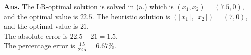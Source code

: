 \documentclass[12pt]{article}
\begin{document}
\begin{enumerate}
\begin{enumerate}
                        \textbf{Ans. } The LR-optimal solution is solved in (a.) which is  $(x_1, x_2) = (7.5, 0)$, and the optimal value is $22.5$. The heuristic solution is $(\lfloor x_1 \rfloor, \lfloor x_2 \rfloor) = (7, 0)$, and the optimal value is $21$. \\
                        The absolute error is $22.5 - 21 = 1.5$.\\
                        The percentage error is $\frac{1.5}{22.5} = 6.67\%$.
            \end{enumerate}
\end{enumerate}
\end{document}
